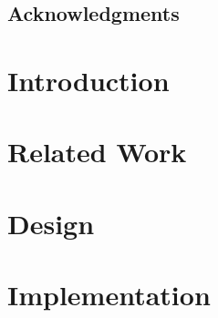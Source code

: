 \documentclass[11pt,twoside,final]{mitthesis}
\begin{document}



\maketitle

\begin{abstractpage}

\end{abstractpage}
\cleardoublepage

\section*{Acknowledgments}
  
\cleardoublepage


\tableofcontents
\clearpage
\listoffigures
\clearpage



\chapter{Introduction}%
\label{ch:introduction}


\chapter{Related Work}%
\label{ch:related}


\chapter{Design}%
\label{ch:design}


\chapter{Implementation}%
\label{ch:impl}

\end{document}

